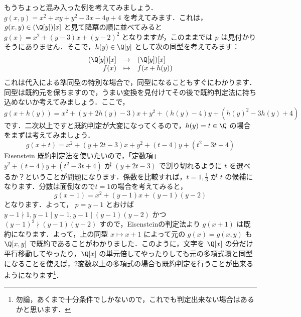 \documentclass[a4j]{ltjsarticle}
\begin{document}
もうちょっと混み入った例を考えてみましょう．$g(x, y) = x^2 + xy + y^2 - 3x - 4y + 4$ を考えてみます．これは，$g(x, y) \in (\Q[y])[x]$ と見て降冪の順に並べてみると $g(x) = x^2 + (y-3)x + (y-2)^2$ となりますが，このままでは $p$ は見付かりそうにありません．そこで，$h(y) \in \Q[y]$ として次の同型を考えてみます：
\[
\begin{array}{rcl}
  (\Q[y])[x] & \to & (\Q[y])[x] \\
  f(x) & \mapsto & f(x + h(y))
\end{array}
\]
これは代入による準同型の特別な場合で，同型になることもすぐにわかります．同型は既約元を保ちますので，うまい変換を見付けてその後で既約判定法に持ち込めないか考えてみましょう．ここで，
\[
 g(x + h(y)) = x^2 + (y+2h(y)-3)x + y^2 + (h(y)-4)y + (h(y)^2 - 3h(y) + 4)
\]
です．二次以上ですと既約判定が大変になってくるので，$h(y) = t \in \Q$ の場合をまずは考えてみましょう．
\[
 g(x + t) = x^2 + (y+2t-3)x + y^2 + (t-4)y + (t^2 - 3t + 4)
\]
Eisenstein 既約判定法を使いたいので，「定数項」$y^2 + (t-4)y + (t^2 - 3t + 4)$ が $(y+2t-3)$ で割り切れるように $t$ を選べるか？ということが問題になります．係数を比較すれば，$t = 1, \frac{1}{3}$ が $t$ の候補になります．分数は面倒なので$t=1$の場合を考えてみると，
\[
 g(x + 1) = x^2 + (y-1)x + (y-1)(y-2)
\]
となります．よって， $p = y-1$ とおけば $y - 1 \nmid 1, y-1 \mid y-1, y-1 \mid (y-1)(y-2)$ かつ $(y-1)^2 \nmid (y-1)(y-2)$ すので，Eisensteinの判定法より $g(x+1)$ は既約になります．よって，上の同型 $x \mapsto x + 1$ によって元の $g(x) = g(x,y)$ も $\Q[x, y]$ で既約であることがわかりました．このように，文字を $\Q[x]$ の分だけ平行移動してやったり，$\Q[x]$ の単元倍してやったりしても元の多項式環と同型になることを使えば，2変数以上の多項式の場合も既約判定を行うことが出来るようになります\footnote{勿論，あくまで十分条件でしかないので，これでも判定出来ない場合はあるかと思います．}．
\end{document}
